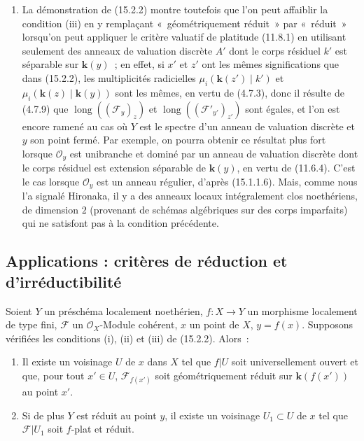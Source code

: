 \begin{remarks}[15.2.4]
\begin{enumerate}[label=(\roman*)]
  \item La démonstration de (15.2.2) montre toutefois que l'on peut affaiblir la
  condition (iii) en y remplaçant «~géométriquement réduit~» par «~réduit~»
  lorsqu'on peut appliquer le critère valuatif de platitude (11.8.1) en utilisant
  seulement des anneaux de valuation discrète $A'$ dont le corps résiduel $k'$
  est séparable sur $\mathbf{k}(y)$~; en effet, si $x'$ et $z'$ ont les mêmes
  significations que dans (15.2.2), les multiplicités radicielles
  $\mu_i(\mathbf{k}(z')\mid k')$ et
  $\mu_i(\mathbf{k}(z)\mid\mathbf{k}(y))$ sont les mêmes, en vertu de (4.7.3),
  donc il résulte de (4.7.9) que $\operatorname{long}((\mathcal F_y)_z)$ et
  $\operatorname{long}((\mathcal F'_{y'})_{z'})$ sont égales, et l'on est encore
  ramené au cas où $Y$ est le spectre d'un anneau de valuation discrète et $y$
  son point fermé. Par exemple, on pourra obtenir ce résultat plus fort lorsque
  $\mathcal O_y$ est unibranche et dominé par un anneau de valuation discrète
  dont le corps résiduel est extension séparable de $\mathbf{k}(y)$, en vertu de
  (11.6.4). C'est le cas lorsque $\mathcal O_y$ est un anneau régulier, d'après
  (15.1.1.6). Mais, comme nous l'a signalé Hironaka, il y a des anneaux locaux
  intégralement clos noethériens, de dimension $2$ (provenant de schémas
  algébriques sur des corps imparfaits) qui ne satisfont pas à la condition
  précédente.
\end{enumerate}
\end{remarks}

\subsection{Applications : critères de réduction et d'irréductibilité}
\label{subsection:IV.15.3-fr}

\begin{proposition}[15.3.1]
\label{IV.15.3.1-fr}
Soient $Y$ un préschéma localement noethérien, $f:X\to Y$ un morphisme localement
de type fini, $\mathcal F$ un $\mathcal O_X$-Module cohérent, $x$ un point de
$X$, $y=f(x)$. Supposons vérifiées les conditions (i), (ii) et (iii) de
(15.2.2). Alors~:
\begin{enumerate}[label=(\roman*)]
  \item Il existe un voisinage $U$ de $x$ dans $X$ tel que $f|U$ soit
  universellement ouvert et que, pour tout $x'\in U$,
  $\mathcal F_{f(x')}$ soit géométriquement réduit sur
  $\mathbf{k}(f(x'))$ au point $x'$.
  \item Si de plus $Y$ est réduit au point $y$, il existe un voisinage
  $U_1\subset U$ de $x$ tel que $\mathcal F|U_1$ soit $f$-plat et réduit.
\end{enumerate}
\end{proposition}

